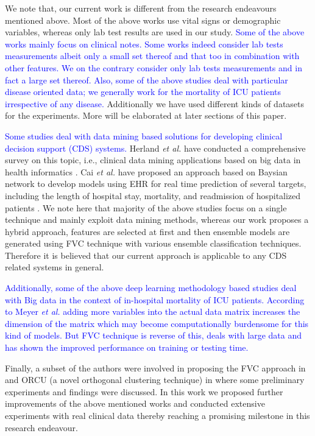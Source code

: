 We note that, our current work is different from the research endeavours mentioned above. Most of the above works use vital signs or demographic variables, whereas only lab test results are used in our study. \textcolor{blue}{Some of the above works mainly focus on clinical notes. Some works indeed consider lab tests measurements albeit only a small set thereof and that too in combination with other features. We on the contrary consider only lab tests measurements and in fact a large set thereof. Also, some of the above studies deal with particular disease oriented data; we generally work for the mortality of ICU patients irrespective of any disease.} Additionally we have used different kinds of datasets for the experiments. More will be elaborated at later sections of this paper.

\textcolor{blue}{Some studies deal with data mining based solutions for developing clinical decision support (CDS) systems.} Herland \textit{et al.} have conducted a comprehensive survey on this topic, i.e., clinical data mining applications based on big data in health informatics \cite{Herland}. Cai \textit{et al.} have proposed an approach based on Baysian network to develop models using EHR for real time prediction of several targets, including the length of hospital stay, mortality, and readmission of hospitalized patients \cite{Cai:2016}. We note here that majority of the above studies focus on a single technique and mainly exploit data mining methods, whereas our work proposes a hybrid approach, features are selected at first and then ensemble models are generated using FVC technique with various ensemble classification techniques. Therefore it is believed that our current approach is applicable to any CDS related systems in general. 

\textcolor{blue}{Additionally, some of the above deep learning methodology based studies deal with Big data in the context of in-hospital mortality of ICU patients. According to Meyer \textit{et al.} \cite{Meyer2018} adding more variables into the actual data matrix increases the dimension of the matrix which may become computationally burdensome for this kind of models. But FVC technique \cite{mehedy-masud:2017:fvc} is reverse of this, deals with large data and has shown the improved performance on training or testing time.}

Finally, a subset of the authors were involved in proposing the FVC approach in \cite{mehedy-masud:2017:fvc} and ORCU (a novel orthogonal clustering technique) in \cite{mehedy-masud:2018:frmwrk} where some preliminary experiments and findings were discussed. In this work we proposed further improvements of the above mentioned works and conducted extensive experiments with real clinical data thereby reaching a promising milestone in this research endeavour.